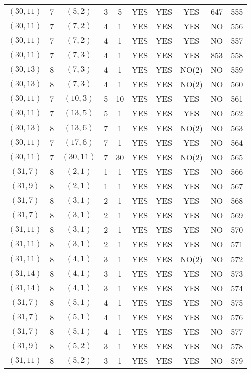 \begin{longtable}{|c|c|c|c|c|c|c|c|c|c|}
$(30, 11)$ & 7 & $(5, 2)$ & 3 & 5 & YES & YES & YES & 647 & 555\\
$(30, 11)$ & 7 & $(7, 2)$ & 4 & 1 & YES & YES & YES & NO & 556\\
$(30, 11)$ & 7 & $(7, 2)$ & 4 & 1 & YES & YES & YES & NO & 557\\
$(30, 11)$ & 7 & $(7, 3)$ & 4 & 1 & YES & YES & YES & 853 & 558\\
$(30, 13)$ & 8 & $(7, 3)$ & 4 & 1 & YES & YES & NO(2) & NO & 559\\
$(30, 13)$ & 8 & $(7, 3)$ & 4 & 1 & YES & YES & NO(2) & NO & 560\\
$(30, 11)$ & 7 & $(10, 3)$ & 5 & 10 & YES & YES & YES & NO & 561\\
$(30, 11)$ & 7 & $(13, 5)$ & 5 & 1 & YES & YES & YES & NO & 562\\
$(30, 13)$ & 8 & $(13, 6)$ & 7 & 1 & YES & YES & NO(2) & NO & 563\\
$(30, 11)$ & 7 & $(17, 6)$ & 7 & 1 & YES & YES & YES & NO & 564\\
$(30, 11)$ & 7 & $(30, 11)$ & 7 & 30 & YES & YES & NO(2) & NO & 565\\
$(31, 7)$ & 8 & $(2, 1)$ & 1 & 1 & YES & YES & YES & NO & 566\\
$(31, 9)$ & 8 & $(2, 1)$ & 1 & 1 & YES & YES & YES & NO & 567\\
$(31, 7)$ & 8 & $(3, 1)$ & 2 & 1 & YES & YES & YES & NO & 568\\
$(31, 7)$ & 8 & $(3, 1)$ & 2 & 1 & YES & YES & YES & NO & 569\\
$(31, 11)$ & 8 & $(3, 1)$ & 2 & 1 & YES & YES & YES & NO & 570\\
$(31, 11)$ & 8 & $(3, 1)$ & 2 & 1 & YES & YES & YES & NO & 571\\
$(31, 11)$ & 8 & $(4, 1)$ & 3 & 1 & YES & YES & NO(2) & NO & 572\\
$(31, 14)$ & 8 & $(4, 1)$ & 3 & 1 & YES & YES & YES & NO & 573\\
$(31, 14)$ & 8 & $(4, 1)$ & 3 & 1 & YES & YES & YES & NO & 574\\
$(31, 7)$ & 8 & $(5, 1)$ & 4 & 1 & YES & YES & YES & NO & 575\\
$(31, 7)$ & 8 & $(5, 1)$ & 4 & 1 & YES & YES & YES & NO & 576\\
$(31, 7)$ & 8 & $(5, 1)$ & 4 & 1 & YES & YES & YES & NO & 577\\
$(31, 9)$ & 8 & $(5, 2)$ & 3 & 1 & YES & YES & YES & NO & 578\\
$(31, 11)$ & 8 & $(5, 2)$ & 3 & 1 & YES & YES & YES & NO & 579\\

\end{longtable}
